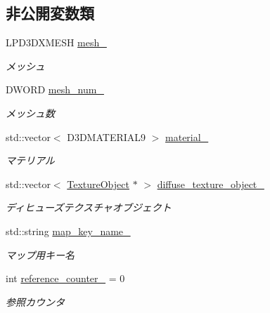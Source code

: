 \subsection*{非公開変数類}
\begin{DoxyCompactItemize}
\item 
L\+P\+D3\+D\+X\+M\+E\+SH \mbox{\hyperlink{class_model_x_object_a5ef4e892e06649ab32ba40e29d8acb8a}{mesh\+\_\+}}
\begin{DoxyCompactList}\small\item\em メッシュ \end{DoxyCompactList}\item 
D\+W\+O\+RD \mbox{\hyperlink{class_model_x_object_af493845ef291f950fcaee2d3eba10bc5}{mesh\+\_\+num\+\_\+}}
\begin{DoxyCompactList}\small\item\em メッシュ数 \end{DoxyCompactList}\item 
std\+::vector$<$ D3\+D\+M\+A\+T\+E\+R\+I\+A\+L9 $>$ \mbox{\hyperlink{class_model_x_object_a6b59d177c6056be64211b34b054e88a6}{material\+\_\+}}
\begin{DoxyCompactList}\small\item\em マテリアル \end{DoxyCompactList}\item 
std\+::vector$<$ \mbox{\hyperlink{class_texture_object}{Texture\+Object}} $\ast$ $>$ \mbox{\hyperlink{class_model_x_object_a1d85909d707f74358802402259c02abc}{diffuse\+\_\+texture\+\_\+object\+\_\+}}
\begin{DoxyCompactList}\small\item\em ディヒューズテクスチャオブジェクト \end{DoxyCompactList}\item 
std\+::string \mbox{\hyperlink{class_model_x_object_a087228b37a2fc93d9ed4b6e0c1abc3f8}{map\+\_\+key\+\_\+name\+\_\+}}
\begin{DoxyCompactList}\small\item\em マップ用キー名 \end{DoxyCompactList}\item 
int \mbox{\hyperlink{class_model_x_object_a8ae0e1ca4a249c3b475d41107c4816d3}{reference\+\_\+counter\+\_\+}} = 0
\begin{DoxyCompactList}\small\item\em 参照カウンタ \end{DoxyCompactList}\end{DoxyCompactItemize}


